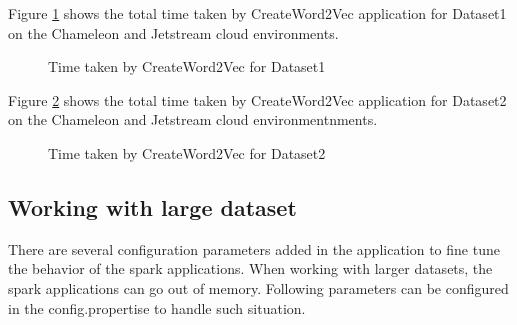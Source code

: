 Figure \ref{fig:compare147} shows the total time taken by CreateWord2Vec
application for Dataset1 on the Chameleon and Jetstream cloud environments.
\begin{figure}[htbp]
\centering
{}
\caption{Time taken by CreateWord2Vec for Dataset1}
\label{fig:compare147}
\end{figure}

Figure \ref{fig:compare522} shows the total time taken by CreateWord2Vec
application for Dataset2 on the Chameleon and Jetstream cloud environmentnments.
\begin{figure}[htbp]
\centering
{}
\caption{Time taken by CreateWord2Vec for Dataset2}
\label{fig:compare522}
\end{figure}

\subsection{Working with large dataset} \label{benchmarklargedatasets}
There are several configuration parameters added in the application to
fine tune the behavior of the spark applications. When working with larger
datasets, the spark applications can go out of memory. Following parameters
can be configured in the config.propertise to handle such situation.

